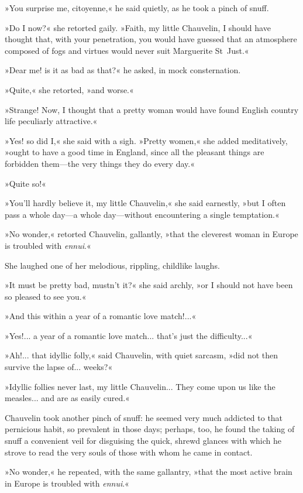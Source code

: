 »You surprise me, citoyenne,« he said quietly, as he took a pinch of snuff.

»Do I now?« she retorted gaily. »Faith, my little Chauvelin, I should have thought that, with your penetration, you would have guessed that an atmosphere composed of fogs and virtues would never suit Marguerite St~Just.«

»Dear me! is it as bad as that?« he asked, in mock consternation.

»Quite,« she retorted, »and worse.«

»Strange! Now, I thought that a pretty woman would have found English country life peculiarly attractive.«

»Yes! so did I,« she said with a sigh. »Pretty women,« she added meditatively, »ought to have a good time in England, since all the pleasant things are forbidden them\allowbreak---\allowbreak the very things they do every day.«

»Quite so!«

»You'll hardly believe it, my little Chauvelin,« she said earnestly, »but I often pass a whole day\allowbreak---\allowbreak a whole day\allowbreak---\allowbreak without encountering a single temptation.«

»No wonder,« retorted Chauvelin, gallantly, »that the cleverest woman in Europe is troubled with \textit{ennui}.«

She laughed one of her melodious, rippling, childlike laughs.

»It must be pretty bad, mustn't it?« she said archly, »or I should not have been so pleased to see you.«

»And this within a year of a romantic love match!...«

»Yes!... a year of a romantic love match... that's just the difficulty...«

»Ah!... that idyllic folly,« said Chauvelin, with quiet sarcasm, »did not then survive the lapse of... weeks?«

»Idyllic follies never last, my little Chauvelin... They come upon us like the measles... and are as easily cured.«

Chauvelin took another pinch of snuff: he seemed very much addicted to that pernicious habit, so prevalent in those days; perhaps, too, he found the taking of snuff a convenient veil for disguising the quick, shrewd glances with which he strove to read the very souls of those with whom he came in contact.

»No wonder,« he repeated, with the same gallantry, »that the most active brain in Europe is troubled with \textit{ennui}.«

